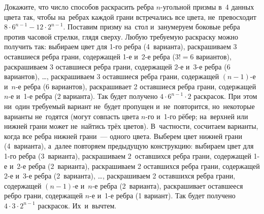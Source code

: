 \problem
Докажите, что число способов раскрасить ребра $n$-угольной призмы в~4 данных
цвета так, чтобы на~ребрах каждой грани встречались все цвета, не~превосходит
$8 \cdot 6^{n-1} - 12 \cdot 2^{n-1}$.
\solution
Поставим призму на~стол и~занумеруем боковые ребра против часовой стрелки,
глядя сверху.
Любую требуемую раскраску можно получить так:
выбираем цвет для 1-го ребра (4~варианта),
раскрашиваем 3 оставшиеся ребра грани, содержащей 1-е и~2-е ребра
($3! = 6$ вариантов),
раскрашиваем 3 оставшиеся ребра грани, содержащей 2-е и~3-е ребра
(6 вариантов),
\ldots,
раскрашиваем 3 оставшиеся ребра грани, содержащей $(n-1)$-е и~$n$-е ребра
(6 вариантов),
раскрашивает 2 оставшиеся ребра грани, содержащей $n$-е и~1-е ребра
(2 варианта).
Так будет получено $4 \cdot 6^{n-1} \cdot 2$ раскрасок.
При этом ни~один требуемый вариант не~будет пропущен и~не~повторится,
но~некоторые варианты не~годятся 
(могут совпасть цвета $n$-го и~1-го рёбер; на~верхней или нижней грани может
не~найтись трёх цветов).
В~частности, сосчитаем варианты, когда все ребра нижней грани~--- одного цвета.
Выберем цвет нижней грани (4~варианта), а~далее повторяем предыдущую
конструкцию: выбираем цвет для 1-го ребра (3~варианта),
раскрашиваем 2~оставшихся ребра грани, содержащей 1-е и~2-е ребра (2~варианта),
раскрашиваем 2 оставшихся ребра грани, содержащей 2-е и~3-е ребра (2~варианта),
\ldots,
раскрашиваем 2 оставшихся ребра грани, содержащей $(n-1)$-е и~$n$-е ребра
(2~варианта),
раскрашивает оставшееся ребро грани, содержащей $n$-е и~1-е ребра
(1 вариант).
Так будет получено $4 \cdot 3 \cdot 2^{n-1}$ раскрасок.
Их~и~вычтем.
\endproblem
